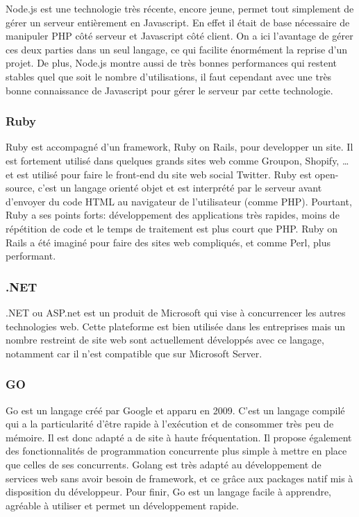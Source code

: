          Node.js est une technologie très récente, encore jeune, permet tout simplement de gérer un serveur entièrement en Javascript.
         En effet il était de base nécessaire de manipuler PHP côté serveur et Javascript côté client. On a ici l’avantage
         de gérer ces deux parties dans un seul langage, ce qui facilite énormément la reprise d’un projet. De plus,
         Node.js montre aussi de très bonnes performances qui restent stables quel que soit le nombre d’utilisations,
         il faut cependant avec une très bonne connaissance de Javascript pour gérer le serveur par cette technologie.

        \subsubsection{Ruby}
        \label{subsubsec:ruby}
        Ruby est accompagné d’un framework, Ruby on Rails, pour developper un site. Il est fortement utilisé
        dans quelques grands sites web comme Groupon, Shopify, … et est utilisé pour faire le front-end du site web social Twitter.
        Ruby est open-source, c’est un langage orienté objet et est interprété par le serveur avant d’envoyer
        du code HTML au navigateur de l’utilisateur (comme PHP). Pourtant, Ruby a ses points forts: développement
        des applications très rapides, moins de répétition de code et le temps de traitement est plus court que PHP.
        Ruby on Rails a été imaginé pour faire des sites web compliqués, et comme Perl, plus performant.

        \subsubsection{.NET}
        \label{subsubsec:dotnet}
        .NET ou ASP.net est un produit de Microsoft qui vise à concurrencer les autres technologies web.
        Cette plateforme est bien utilisée dans les entreprises mais un nombre restreint de site web sont actuellement
        développés avec ce langage, notamment car il n’est compatible que sur Microsoft Server.

        \subsubsection{GO}
        \label{subsubsec:go}
        Go est un langage créé par Google et apparu en 2009. C’est un langage compilé qui a la particularité d’être rapide
        à l’exécution et de consommer très peu de mémoire. Il est donc adapté a de site à haute fréquentation.
        Il propose également des fonctionnalités de programmation concurrente plus simple à mettre en place que celles de ses concurrents.
        Golang est très adapté au développement de services web sans avoir besoin de framework, et ce grâce aux packages
        natif mis à disposition du développeur. Pour finir, Go est un langage facile à apprendre, agréable à utiliser
        et permet un développement rapide.

